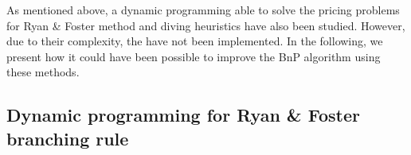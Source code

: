 As mentioned above, a dynamic programming able to solve the pricing problems for Ryan \& Foster method and diving heuristics have also been studied. However, due to their complexity, the have not been implemented. In the following, we present how it could have been possible to improve the BnP algorithm using these methods.

\subsection{Dynamic programming for Ryan \& Foster branching rule}
\label{dynamic_rf}